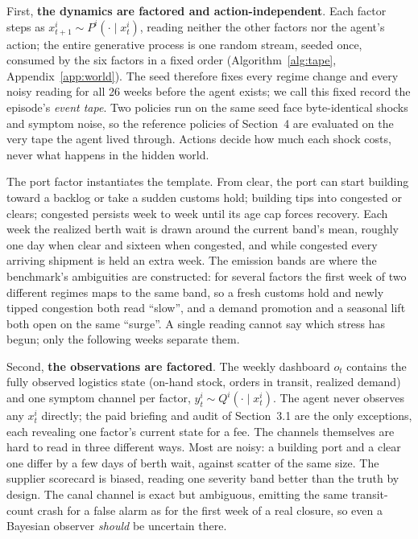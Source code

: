 \documentclass{article}
\begin{document}
First, \textbf{the dynamics are factored and action-independent}. Each
factor steps as $x_{t+1}^i \sim P^i(\cdot \mid x_t^i)$, reading neither
the other factors nor the agent's action; the entire generative process
is one random stream, seeded once, consumed by the six factors in a
fixed order (Algorithm~\ref{alg:tape}, Appendix~\ref{app:world}). The
seed therefore fixes every regime change and every noisy reading for all
26 weeks before the agent exists; we call this fixed record the
episode's \emph{event tape}. Two policies run on the same seed face
byte-identical shocks and symptom noise, so the reference policies of
Section~4 are evaluated on the very tape the agent lived through.
Actions decide how much each shock costs, never what happens in the
hidden world.

The port factor instantiates the template. From clear, the port can
start building toward a backlog or take a sudden customs hold; building
tips into congested or clears; congested persists week to week until its
age cap forces recovery. Each week the realized berth wait is drawn
around the current band's mean, roughly one day when clear and sixteen
when congested, and while congested every arriving shipment is held an
extra week. The emission bands are where the benchmark's ambiguities are
constructed: for several factors the first week of two different regimes
maps to the same band, so a fresh customs hold and newly tipped
congestion both read ``slow'', and a demand promotion and a seasonal
lift both open on the same ``surge''. A single reading cannot say which
stress has begun; only the following weeks separate them.

Second, \textbf{the observations are factored}. The weekly dashboard
$o_t$ contains the fully observed logistics state (on-hand stock, orders
in transit, realized demand) and one symptom channel per factor,
$y_t^i \sim Q^i(\cdot \mid x_t^i)$. The agent never observes any $x_t^i$
directly; the paid briefing and audit of Section~3.1 are the only
exceptions, each revealing one factor's current state for a fee. The
channels themselves are hard to read in three different ways. Most are
noisy: a building port and a clear one differ by a few days of berth
wait, against scatter of the same size. The supplier scorecard is
biased, reading one severity band better than the truth by design. The
canal channel is exact but ambiguous, emitting the
same transit-count crash for a false alarm as for the first week of a real
closure, so even a Bayesian observer \emph{should} be uncertain there.
\end{document}
